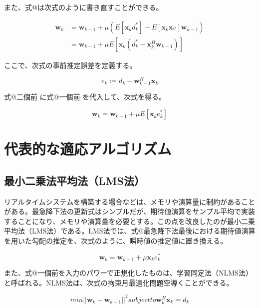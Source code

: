 また、式@は次式のように書き直すことができる。

\begin{equation}
\begin{split}
\bm{w}_k &= \bm{w}_{k-1} + \mu (E[\bm{x}_k d_k^*] - E[\bm{x}_k \bm{x}_^H] \bm{w}_{k-1}) \\
         &= \bm{w}_{k-1} + \mu E[\bm{x}_k (d_k^* - \bm{x}_k^H \bm{w}_{k-1})]
\end{split}
\end{equation}

ここで、次式の事前推定誤差を定義する。

\begin{equation}
e_k := d_k - \bm{w}_{k-1}^H \bm{x}_k
\end{equation}

式@二個前 に式@一個前 を代入して、次式を得る。

\begin{equation}
\bm{w}_k = \bm{w}_{k-1} + \mu E[\bm{x}_k e_k^*]
\end{equation}


\section{代表的な適応アルゴリズム}\label{main-algo}

\subsection{最小二乗法平均法（LMS法）}\label{lms}

リアルタイムシステムを構築する場合などは、メモリや演算量に制約があることがある。最急降下法の更新式はシンプルだが、期待値演算をサンプル平均で実装することになり、メモリや演算量を必要とする。この点を改良したのが最小二乗平均法（LMS法）である。LMS法では、式@最急降下法最後における期待値演算を用いた勾配の推定を、次式のように、瞬時値の推定値に置き換える。

\begin{equation}
\bm{w}_k = \bm{w}_{k-1} + \mu \bm{x}_k e_k^*
\end{equation}

また、式@一個前を入力のパワーで正規化したものは、学習同定法（NLMS法）と呼ばれる。NLMS法は、次式の拘束月最適化問題空導くことができる。

\begin{equation}
min ||\bm{w}_k - \bm{w}_{k-1}||^2 subject to \bm{w}_k^H \bm{x}_k = d_k
\end{equation}

